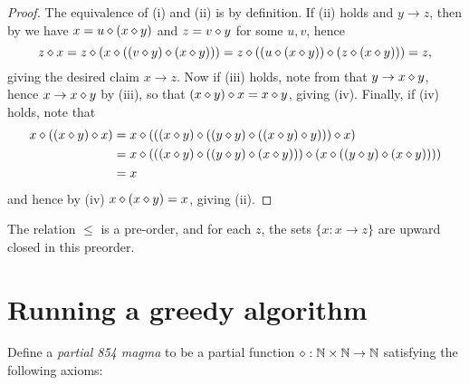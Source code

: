 \begin{proof}  The equivalence of (i) and (ii) is by definition.  If (ii) holds and $y \to z$, then by  we have $x = u \diamond (x \diamond y)$ and $z = v \diamond y$ for some $u,v$, hence
  $$ z \diamond x = z \diamond (x \diamond ((v \diamond y) \diamond (x \diamond y))) = z \diamond ((u \diamond (x \diamond y)) \diamond (z \diamond (x \diamond y))) = z,$$
giving the desired claim $x \to z$.  Now if (iii) holds, note from  that $y \to x \diamond y$, hence $x \to x \diamond y$ by (iii), so that $(x \diamond y) \diamond x = x \diamond y$, giving (iv).  Finally, if (iv) holds, note that
\begin{align*}
  x \diamond ((x \diamond y) \diamond x) &= x \diamond ( ((x \diamond y) \diamond ((y \diamond y) \diamond ((x \diamond y) \diamond y))) \diamond x) \\
  &= x \diamond (((x \diamond y) \diamond ((y \diamond y) \diamond (x \diamond y))) \diamond (x \diamond ((y \diamond y) \diamond (x \diamond y)))) \\
  &= x
\end{align*}
and hence by (iv) $x \diamond (x \diamond y) = x$, giving (ii).
\end{proof}

\begin{corollary}  The relation $\leq$ is a pre-order, and for each $z$, the sets $\{ x: x \to z \}$ are upward closed in this preorder.
\end{corollary}



\section{Running a greedy algorithm}

Define a \emph{partial 854 magma} to be a partial function $\diamond: \mathbb{N} \times \mathbb{N} \to \mathbb{N}$ satisfying the following axioms:

